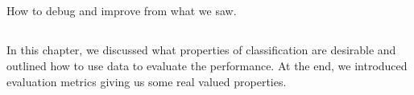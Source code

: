 \subsection{}

How to debug and improve from what we saw.

\subsection{}

In this chapter, we discussed what properties of classification are desirable
and outlined how to use data to evaluate the performance.
At the end, we introduced evaluation metrics giving us some real valued properties.

